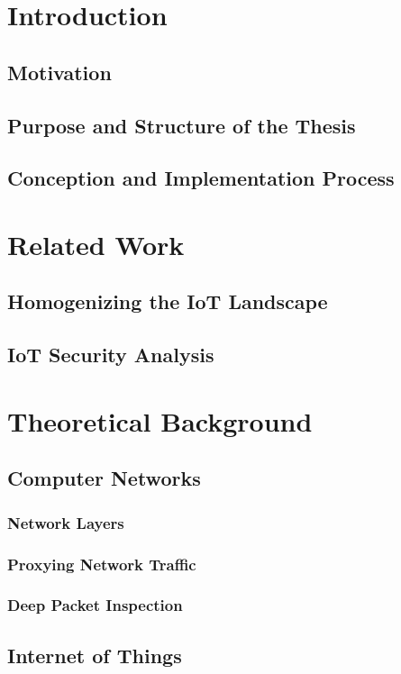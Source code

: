 \chapter{Introduction}

\section{Motivation}
\section{Purpose and Structure of the Thesis}
\section{Conception and Implementation Process}

\chapter{Related Work}
\section{Homogenizing the IoT Landscape}
\cite{wenquan2018proxy}
\section{IoT Security Analysis}
\cite{apthorpe2017smart}

\chapter{Theoretical Background}
\section{Computer Networks}
\subsection{Network Layers}
\subsection{Proxying Network Traffic}
\subsection{Deep Packet Inspection}

\section{Internet of Things}
